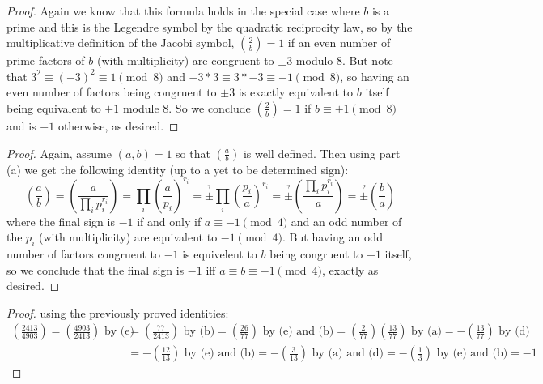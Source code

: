 \documentclass[11pt]{article}
\newcommand{\legendre}[2]{\genfrac{(}{)}{}{}{#1}{#2}}
\begin{document}
\begin{proof}
  Again we know that this formula holds in the special case where $b$ is a prime and this is the Legendre symbol by the quadratic reciprocity law, so by the multiplicative definition of the Jacobi symbol, $\legendre{2}{b} = 1$ if an even number of prime factors of $b$ (with multiplicity) are congruent to $\pm 3$ modulo $8$.
  But note that $3^2 \equiv (-3)^2 \equiv 1 \pmod 8$ and $-3 * 3 \equiv 3 * -3 \equiv -1 \pmod 8$, so having an even number of factors being congruent to $\pm 3$ is exactly equivalent to $b$ itself being equivalent to $\pm 1$ module $8$.
  So we conclude $\legendre{2}{b} = 1$ if $b \equiv \pm 1 \pmod 8$ and is $-1$ otherwise, as desired.
\end{proof}

\begin{proof}
  Again, assume $(a,b) = 1$ so that $\legendre{a}{b}$ is well defined. Then using part (a) we get the following identity (up to a yet to be determined sign):
  \begin{equation*}
    \legendre{a}{b} = \legendre{a}{\prod_i p_i^{r_i}}
    = \prod_i \legendre{a}{p_i}^{r_i}
    = \stackrel{?}{\pm} \prod_i \legendre{p_i}{a}^{r_i}
    = \stackrel{?}{\pm} \legendre{\prod_i p_i^{r_i}}{a}
    = \stackrel{?}{\pm} \legendre{b}{a}
  \end{equation*}
  where the final sign is $-1$ if and only if $a \equiv -1 \pmod 4$ and an odd number of the $p_i$ (with multiplicity) are equivalent to $-1 \pmod 4$.
  But having an odd number of factors congruent to $-1$ is equivelent to $b$ being congruent to $-1$ itself, so we conclude that the final sign is $-1$ iff $a \equiv b \equiv -1 \pmod 4$, exactly as desired. 
\end{proof}

\begin{proof}
  using the previously proved identities:
  \begin{align*}
    \legendre{2413}{4903}
    = \legendre{4903}{2413} \text{ by (e)} 
    &= \legendre{77}{2413} \text{ by (b)} 
    = \legendre{26}{77} \text{ by (e) and (b)}
    = \legendre{2}{77} \legendre{13}{77} \text{ by (a)} 
    = - \legendre{13}{77} \text{ by (d)} \\
    &= - \legendre{12}{13} \text{ by (e) and (b)} 
    = - \legendre{3}{13} \text{ by (a) and (d)} 
    = - \legendre{1}{3} \text{ by (e) and (b)} 
    = -1
  \end{align*}
\end{proof}
\end{document}
